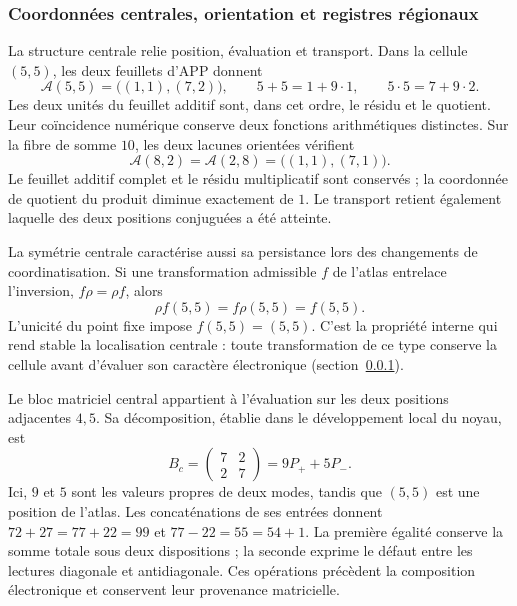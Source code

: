 \subsubsection{Coordonnées centrales, orientation et registres régionaux}
\label{el-centro:registros}

La structure centrale relie position, évaluation et transport. Dans la
cellule \((5,5)\), les deux feuillets d'APP donnent
\begin{equation}
 \mathcal A(5,5)=\bigl((1,1),(7,2)\bigr),\qquad
 5+5=1+9\cdot1,\qquad5\cdot5=7+9\cdot2.
 \label{el-centro:app}
\end{equation}
Les deux unités du feuillet additif sont, dans cet ordre, le résidu et le quotient.
Leur coïncidence numérique conserve deux fonctions arithmétiques distinctes.
Sur la fibre de somme \(10\), les deux lacunes orientées vérifient
\begin{equation}
 \mathcal A(8,2)=\mathcal A(2,8)=\bigl((1,1),(7,1)\bigr).
 \label{el-centro:vacancias}
\end{equation}
Le feuillet additif complet et le résidu multiplicatif sont conservés ;
la coordonnée de quotient du produit diminue exactement de
\(1\). Le transport retient également laquelle des deux positions
conjuguées a été atteinte.



La symétrie centrale caractérise aussi sa persistance lors des changements de
coordinatisation. Si une transformation admissible \(f\) de l'atlas entrelace
l'inversion, \(f\rho=\rho f\), alors
\[
 \rho f(5,5)=f\rho(5,5)=f(5,5).
\]
L’unicité du point fixe impose \(f(5,5)=(5,5)\). C’est la
propriété interne qui rend stable la localisation centrale : toute
transformation de ce type conserve la cellule avant d’évaluer son
caractère électronique (section~\ref{el-centro:registros}).

Le bloc matriciel central appartient à l'évaluation sur les deux
positions adjacentes \(4,5\). Sa décomposition, établie dans le
développement local du noyau, est
\[
 B_c=\begin{pmatrix}7&2\\2&7\end{pmatrix}=9P_++5P_-.
\]
Ici, \(9\) et \(5\) sont les valeurs propres de deux modes, tandis que
\((5,5)\) est une position de l'atlas. Les concaténations de ses
entrées donnent \(72+27=77+22=99\) et
\(77-22=55=54+1\). La première égalité conserve la somme totale sous
deux dispositions ; la seconde exprime le défaut entre les lectures
diagonale et antidiagonale. Ces opérations précèdent la composition
électronique et conservent leur provenance matricielle.

